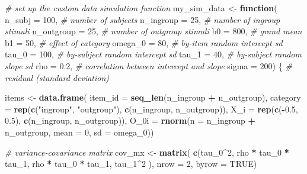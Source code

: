 \documentclass[
  english,
  doc,floatsintext]{apa6}
\newenvironment{Shaded}{\begin{snugshade}}{\end{snugshade}}
\newcommand{\CommentTok}[1]{\textcolor[rgb]{0.56,0.35,0.01}{\textit{#1}}}
\newcommand{\ControlFlowTok}[1]{\textcolor[rgb]{0.13,0.29,0.53}{\textbf{#1}}}
\newcommand{\DataTypeTok}[1]{\textcolor[rgb]{0.13,0.29,0.53}{#1}}
\newcommand{\DecValTok}[1]{\textcolor[rgb]{0.00,0.00,0.81}{#1}}
\newcommand{\FloatTok}[1]{\textcolor[rgb]{0.00,0.00,0.81}{#1}}
\newcommand{\KeywordTok}[1]{\textcolor[rgb]{0.13,0.29,0.53}{\textbf{#1}}}
\newcommand{\NormalTok}[1]{#1}
\newcommand{\OperatorTok}[1]{\textcolor[rgb]{0.81,0.36,0.00}{\textbf{#1}}}
\newcommand{\OtherTok}[1]{\textcolor[rgb]{0.56,0.35,0.01}{#1}}
\newcommand{\StringTok}[1]{\textcolor[rgb]{0.31,0.60,0.02}{#1}}
\begin{document}
\begin{Shaded}
\begin{Highlighting}[]
\CommentTok{# set up the custom data simulation function}
\NormalTok{my_sim_data <-}\StringTok{ }\ControlFlowTok{function}\NormalTok{(}
  \DataTypeTok{n_subj      =} \DecValTok{100}\NormalTok{,   }\CommentTok{# number of subjects}
  \DataTypeTok{n_ingroup  =}  \DecValTok{25}\NormalTok{,   }\CommentTok{# number of ingroup stimuli}
  \DataTypeTok{n_outgroup =}  \DecValTok{25}\NormalTok{,   }\CommentTok{# number of outgroup stimuli}
  \DataTypeTok{b0         =} \DecValTok{800}\NormalTok{,   }\CommentTok{# grand mean}
  \DataTypeTok{b1         =}  \DecValTok{50}\NormalTok{,   }\CommentTok{# effect of category}
  \DataTypeTok{omega_0    =}  \DecValTok{80}\NormalTok{,   }\CommentTok{# by-item random intercept sd}
  \DataTypeTok{tau_0      =} \DecValTok{100}\NormalTok{,   }\CommentTok{# by-subject random intercept sd}
  \DataTypeTok{tau_1      =}  \DecValTok{40}\NormalTok{,   }\CommentTok{# by-subject random slope sd}
  \DataTypeTok{rho        =} \FloatTok{0.2}\NormalTok{,   }\CommentTok{# correlation between intercept and slope}
  \DataTypeTok{sigma      =} \DecValTok{200}\NormalTok{) \{ }\CommentTok{# residual (standard deviation)}

\NormalTok{  items <-}\StringTok{ }\KeywordTok{data.frame}\NormalTok{(}
    \DataTypeTok{item_id =} \KeywordTok{seq_len}\NormalTok{(n_ingroup }\OperatorTok{+}\StringTok{ }\NormalTok{n_outgroup),}
    \DataTypeTok{category =} \KeywordTok{rep}\NormalTok{(}\KeywordTok{c}\NormalTok{(}\StringTok{"ingroup"}\NormalTok{, }\StringTok{"outgroup"}\NormalTok{), }\KeywordTok{c}\NormalTok{(n_ingroup, n_outgroup)),}
    \DataTypeTok{X_i =} \KeywordTok{rep}\NormalTok{(}\KeywordTok{c}\NormalTok{(}\OperatorTok{-}\FloatTok{0.5}\NormalTok{, }\FloatTok{0.5}\NormalTok{), }\KeywordTok{c}\NormalTok{(n_ingroup, n_outgroup)),}
    \DataTypeTok{O_0i =} \KeywordTok{rnorm}\NormalTok{(}\DataTypeTok{n =}\NormalTok{ n_ingroup }\OperatorTok{+}\StringTok{ }\NormalTok{n_outgroup, }\DataTypeTok{mean =} \DecValTok{0}\NormalTok{, }\DataTypeTok{sd =}\NormalTok{ omega_}\DecValTok{0}\NormalTok{))}

  \CommentTok{# variance-covariance matrix}
\NormalTok{  cov_mx  <-}\StringTok{ }\KeywordTok{matrix}\NormalTok{(}
    \KeywordTok{c}\NormalTok{(tau_}\DecValTok{0}\OperatorTok{^}\DecValTok{2}\NormalTok{,             rho }\OperatorTok{*}\StringTok{ }\NormalTok{tau_}\DecValTok{0} \OperatorTok{*}\StringTok{ }\NormalTok{tau_}\DecValTok{1}\NormalTok{,}
\NormalTok{      rho }\OperatorTok{*}\StringTok{ }\NormalTok{tau_}\DecValTok{0} \OperatorTok{*}\StringTok{ }\NormalTok{tau_}\DecValTok{1}\NormalTok{, tau_}\DecValTok{1}\OperatorTok{^}\DecValTok{2}\NormalTok{            ),}
    \DataTypeTok{nrow =} \DecValTok{2}\NormalTok{, }\DataTypeTok{byrow =} \OtherTok{TRUE}\NormalTok{)}


\end{Highlighting}
\end{Shaded}
\end{document}
